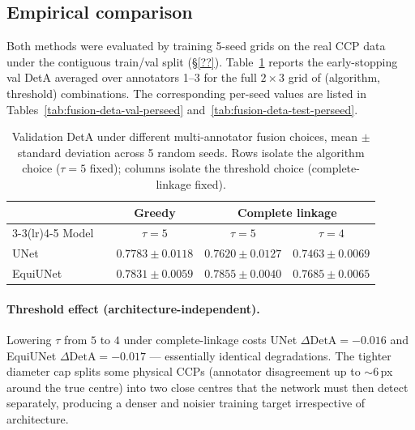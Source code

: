 \subsection{Empirical comparison}
\label{sec:fusion-comparison}

Both methods were evaluated by training 5-seed grids on the real CCP data
under the contiguous train/val split (\S\ref{??}). Table~\ref{tab:fusion-deta}
reports the early-stopping val DetA averaged over annotators 1--3 for the
full $2 \times 3$ grid of (algorithm, threshold) combinations. The
corresponding per-seed values are listed in
Tables~\ref{tab:fusion-deta-val-perseed} and~\ref{tab:fusion-deta-test-perseed}.

\begin{table}[ht]
\centering
\caption{Validation DetA under different multi-annotator fusion choices,
mean $\pm$ standard deviation across 5 random seeds. Rows isolate the
algorithm choice ($\tau = 5$ fixed); columns isolate the threshold choice
(complete-linkage fixed).}
\label{tab:fusion-deta}
\begin{tabular}{l l c c c}
\toprule
 &  & \textbf{Greedy} & \multicolumn{2}{c}{\textbf{Complete linkage}} \\
\cmidrule(lr){3-3}\cmidrule(lr){4-5}
Model    & & $\tau{=}5$           & $\tau{=}5$           & $\tau{=}4$           \\
\midrule
UNet     & & $0.7783 \pm 0.0118$  & $0.7620 \pm 0.0127$  & $0.7463 \pm 0.0069$  \\
EquiUNet & & $0.7831 \pm 0.0059$  & $0.7855 \pm 0.0040$  & $0.7685 \pm 0.0065$  \\
\bottomrule
\end{tabular}
\end{table}

\paragraph{Threshold effect (architecture-independent).}
Lowering $\tau$ from $5$ to $4$ under complete-linkage costs UNet
$\Delta \mathrm{DetA} = -0.016$ and EquiUNet $\Delta \mathrm{DetA} = -0.017$
--- essentially identical degradations. The tighter diameter cap splits
some physical CCPs (annotator disagreement up to $\sim 6$\,px around the
true centre) into two close centres that the network must then detect
separately, producing a denser and noisier training target irrespective of
architecture.

